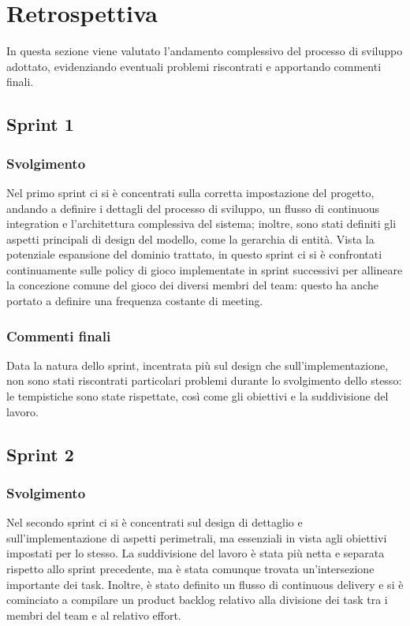 \section{Retrospettiva}
In questa sezione viene valutato l'andamento complessivo del processo di sviluppo adottato, evidenziando eventuali
problemi riscontrati e apportando commenti finali.

\subsection{Sprint 1}
\subsubsection*{Svolgimento}
Nel primo sprint ci si è concentrati sulla corretta impostazione del progetto, andando a definire i dettagli del
processo di sviluppo, un flusso di continuous integration e l'architettura complessiva del sistema; inoltre, sono stati
definiti gli aspetti principali di design del modello, come la gerarchia di entità. Vista la potenziale espansione del
dominio trattato, in questo sprint ci si è confrontati continuamente sulle policy di gioco implementate in sprint
successivi per allineare la concezione comune del gioco dei diversi membri del team: questo ha anche portato a definire
una frequenza costante di meeting.

\subsubsection*{Commenti finali}
Data la natura dello sprint, incentrata più sul design che sull'implementazione, non sono stati riscontrati particolari
problemi durante lo svolgimento dello stesso: le tempistiche sono state rispettate, così come gli obiettivi e la
suddivisione del lavoro.

\subsection{Sprint 2}
\subsubsection*{Svolgimento}
Nel secondo sprint ci si è concentrati sul design di dettaglio e sull'implementazione di aspetti perimetrali, ma
essenziali in vista agli obiettivi impostati per lo stesso. La suddivisione del lavoro è stata più netta e separata
rispetto allo sprint precedente, ma è stata comunque trovata un'intersezione importante dei task. Inoltre, è stato
definito un flusso di continuous delivery e si è cominciato a compilare un product backlog relativo alla divisione dei
task tra i membri del team e al relativo effort.

